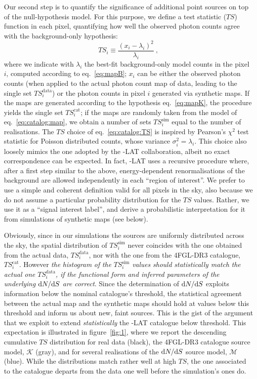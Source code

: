 \medskip
%
Our second step is to quantify the significance of additional point sources on top of the
null-hypothesis model.
%
For this purpose, we define a test statistic ($TS$) function in each pixel, quantifying how well the  observed photon counts agree with the background-only hypothesis:    
\begin{equation}
    TS_i \equiv \frac{(x_i - \lambda_i)^2}{\lambda_i}~,
\label{eq:catalog:TS}
\end{equation}
where we indicate with $\lambda_i$ the best-fit background-only model counts in the pixel $i$, computed according to eq.~\eqref{eq:mapB};  $x_i$ can be either the observed photon counts 
(when applied to the actual photon count map of data, leading to the single set $TS^\textrm{data}_i$) or the  photon counts in pixel $i$ generated via synthetic maps. If the maps are generated according to  the hypothesis eq.~\eqref{eq:mapK}, the procedure yields the single set $TS^\textrm{cat}_i$; if the maps are randomly taken from the model of eq.~\eqref{eq:catalog:map}, we obtain a number of sets $TS^\textrm{sim}_i$ equal to the number of realisations.
The $TS$ choice of eq.~\eqref{eq:catalog:TS} is inspired by Pearson's $\chi^2$ test statistic for Poisson distributed counts,
whose variance $\sigma_i^2=\lambda_i$. 
This choice also loosely mimics the one adopted by the \Fermi-LAT collaboration, albeit no exact correspondence can be expected.  In fact, \Fermi-LAT uses a recursive procedure where, after a first step similar to the above, energy-dependent renormalisations of the background are allowed independently in each ``region of interest''.  We prefer to use a simple and coherent definition valid for all pixels in the sky, also because we do not assume a particular probability distribution for the $TS$ values. Rather, we use it as a ``signal interest label'', and derive a probabilistic interpretation for it from simulations of synthetic maps (see below). 

Obviously, since in our simulations the sources are uniformly distributed across the sky, the spatial distribution of $TS^\textrm{sim}_i$  never coincides with the one obtained from the actual data, $TS^\textrm{data}_i$, nor with the one from the 4FGL-DR3 catalogue, $TS^\textrm{cat}_i$. However \textit{the histogram of the $TS^\textrm{sim}_i$ values should statistically match the actual one $TS^\textrm{data}_i$, if the functional form and inferred parameters of the underlying $\textrm{d}N/\textrm{d}S$ are correct}.  
Since the determination of $\textrm{d}N/\textrm{d}S$ exploits information below the nominal catalogue's threshold, the statistical agreement between the actual map and the synthetic maps should hold at values below this threshold and inform us about new, faint sources. This is the gist of the argument that we exploit to extend \textit{statistically} the \Fermi-LAT catalogue below threshold. This expectation is illustrated in figure~\ref{fig:1}, where we report the descending cumulative $TS$ distribution for real data (black), the 4FGL-DR3 catalogue source model, $\mathcal{K}$ (gray), and for several realisations of the $\textrm{d}N/\textrm{d}S$ source model, $\mathcal{M}$ (blue). While the distributions match rather well at high $TS$, the one associated to the catalogue departs from the data one well before the simulation's ones do. 


